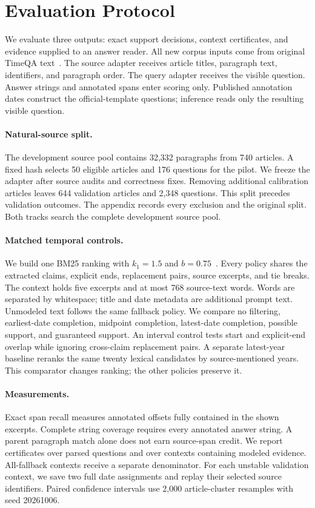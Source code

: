 \section{Evaluation Protocol}
\label{sec:protocol}

We evaluate three outputs: exact support decisions, context certificates, and evidence supplied to an answer reader.
All new corpus inputs come from original TimeQA text~\citep{chen2021timeqa}.
The source adapter receives article titles, paragraph text, identifiers, and paragraph order.
The query adapter receives the visible question.
Answer strings and annotated spans enter scoring only.
Published annotation dates construct the official-template questions; inference reads only the resulting visible question.

\paragraph{Natural-source split.}
The development source pool contains 32,332 paragraphs from 740 articles.
A fixed hash selects 50 eligible articles and 176 questions for the pilot.
We freeze the adapter after source audits and correctness fixes.
Removing additional calibration articles leaves 644 validation articles and 2,348 questions.
This split precedes validation outcomes.
The appendix records every exclusion and the original split.
Both tracks search the complete development source pool.

\paragraph{Matched temporal controls.}
We build one BM25 ranking with $k_1=1.5$ and $b=0.75$~\citep{robertson1995bm25}.
Every policy shares the extracted claims, explicit ends, replacement pairs, source excerpts, and tie breaks.
The context holds five excerpts and at most 768 source-text words.
Words are separated by whitespace; title and date metadata are additional prompt text.
Unmodeled text follows the same fallback policy.
We compare no filtering, earliest-date completion, midpoint completion, latest-date completion, possible support, and guaranteed support.
An interval control tests start and explicit-end overlap while ignoring cross-claim replacement pairs.
A separate latest-year baseline reranks the same twenty lexical candidates by source-mentioned years.
This comparator changes ranking; the other policies preserve it.

\paragraph{Measurements.}
Exact span recall measures annotated offsets fully contained in the shown excerpts.
Complete string coverage requires every annotated answer string.
A parent paragraph match alone does not earn source-span credit.
We report certificates over parsed questions and over contexts containing modeled evidence.
All-fallback contexts receive a separate denominator.
For each unstable validation context, we save two full date assignments and replay their selected source identifiers.
Paired confidence intervals use 2,000 article-cluster resamples with seed 20261006.

